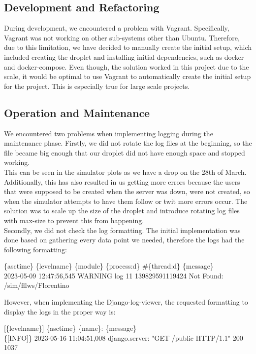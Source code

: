 \subsection*{Development and Refactoring}

During development, we encountered a problem with Vagrant. Specifically, Vagrant was not working on other sub-systems other than Ubuntu. Therefore, due to this limitation, we have decided to manually create the initial setup, which included creating the droplet and installing initial dependencies, such as docker and docker-compose. Even though, the solution worked in this project due to the scale, it would be optimal to use Vagrant to automatically create the initial setup for the project. This is especially true for large scale projects.

\subsection*{Operation and Maintenance}

We encountered two problems when implementing logging during the maintenance phase. Firstly, we did not rotate the log files at the beginning, so the file became big enough that our droplet did not have enough space and stopped working.\\
This can be seen in the simulator plots as we have a drop on the 28th of March. Additionally, this has also resulted in us getting more errors because the users that were supposed to be created when the server was down, were not created, so when the simulator attempts to have them follow or twit more errors occur. The solution was to scale up the size of the droplet and introduce rotating log files with max-size to prevent this from happening.\\
Secondly, we did not check the log formatting. The initial implementation was done based on gathering every data point we needed, therefore the logs had the following formatting:
\begin{center}
    \{asctime\} \{levelname\} \{module\} \{process:d\} \#\{thread:d\} \{message\}\\
    2023-05-09 12:47:56,545 WARNING log 11 139829591119424 Not Found: /sim/fllws/Florentino
\end{center}
However, when implementing the Django-log-viewer, the requested formatting to display the logs in the proper way is:

\begin{center}
    [\{levelname\}] \{asctime\} \{name\}: \{message\}\\
    \{[INFO]\} 2023-05-16 11:04:51,008 django.server: "GET /public HTTP/1.1" 200 1037
\end{center}

